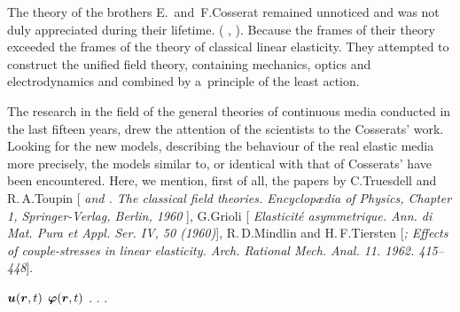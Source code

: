 \begin{tcolorbox}[breakable, enhanced, colback = orange!8, before upper={\parindent3.2ex}, parbox = false]
The theory of the brothers E.~and~F.\;Cosserat remained unnoticed and was not duly appreciated during their lifetime.
\ru{,}
( ,
 ).
Because the frames of their theory exceeded the frames of the theory of classical linear elasticity.
They attempted to construct the unified field theory, containing mechanics, optics and electrodynamics and combined by a~principle of the least action.

The research in the field of the general theories of continuous media conducted in the last fifteen years,
drew the attention of the scientists to the Cosserats’ work.
Looking for the new models,
describing the behaviour of the real elastic media more precisely,
the models similar to, or identical with that of Cosserats’
have been encountered.
Here, we mention, first of all,
the papers by C.\:Truesdell and R.\,A.\;Toupin [\textit{  and .
The classical field theories.
Encyclopædia of Physics, Chapter 1, Springer\hbox{-}Verlag, Berlin, 1960 }],
%
G.\:Grioli [\textit{ Elasticité asymmetrique. Ann. di Mat. Pura et Appl. Ser. IV, 50 (1960)}],
R.\,D.\;Mindlin and H.\,F.\;Tiersten
[\textit{;
Effects of couple-stresses in linear elasticity. Arch. Rational Mech. Anal. 11. 1962. 415\hbox{--}448}].
\par
\end{tcolorbox}

\vspace{2mm}

\en{,}
${\bm{u}(\bm{r}, t)}$
${\bm{\varphi}(\bm{r}, t)}$
.
.
.

